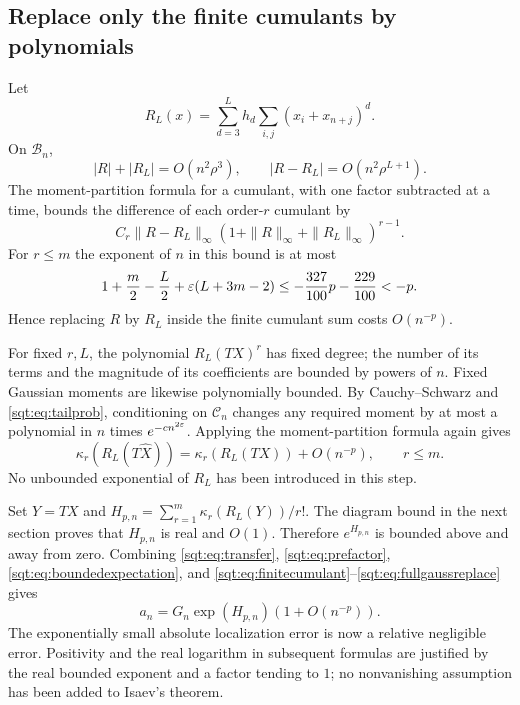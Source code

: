 \subsection{Replace only the finite cumulants by polynomials}
Let
\[
R_L(x)=\sum_{d=3}^L h_d\sum_{i,j}(x_i+x_{n+j})^d.
\]
On $\mathcal B_n$,
\begin{equation}\label{sqt:eq:RLbounds}
|R|+|R_L|=O(n^2\rho^3),\qquad |R-R_L|=O(n^2\rho^{L+1}).
\end{equation}
The moment-partition formula for a cumulant, with one factor subtracted at a time, bounds the difference of each order-$r$ cumulant by
\[
C_r\|R-R_L\|_\infty
 (1+\|R\|_\infty+\|R_L\|_\infty)^{r-1}.
\]
For $r\leq m$ the exponent of $n$ in this bound is at most
\begin{equation}\label{sqt:eq:replacementexponent}
1+\frac m2-\frac L2+\varepsilon(L+3m-2)
 \leq-\frac{327}{100}p-\frac{229}{100}<-p.
\end{equation}
Hence replacing $R$ by $R_L$ inside the finite cumulant sum costs $O(n^{-p})$.

For fixed $r,L$, the polynomial $R_L(TX)^r$ has fixed degree; the number of its terms and the magnitude of its coefficients are bounded by powers of $n$. Fixed Gaussian moments are likewise polynomially bounded. By Cauchy--Schwarz and \eqref{sqt:eq:tailprob}, conditioning on $\mathcal C_n$ changes any required moment by at most a polynomial in $n$ times $e^{-c n^{2\varepsilon}}$. Applying the moment-partition formula again gives
\begin{equation}\label{sqt:eq:fullgaussreplace}
\kappa_r(R_L(T\widehat X))=\kappa_r(R_L(TX))+O(n^{-p}),\qquad r\leq m.
\end{equation}
No unbounded exponential of $R_L$ has been introduced in this step.

Set $Y=TX$ and $H_{p,n}=\sum_{r=1}^m\kappa_r(R_L(Y))/r!$. The diagram bound in the next section proves that $H_{p,n}$ is real and $O(1)$. Therefore $e^{H_{p,n}}$ is bounded above and away from zero. Combining \eqref{sqt:eq:transfer}, \eqref{sqt:eq:prefactor}, \eqref{sqt:eq:boundedexpectation}, and \eqref{sqt:eq:finitecumulant}--\eqref{sqt:eq:fullgaussreplace} gives
\begin{equation}\label{sqt:eq:analyticreduction}
a_n=G_n\exp(H_{p,n})(1+O(n^{-p})).
\end{equation}
The exponentially small absolute localization error is now a relative negligible error. Positivity and the real logarithm in subsequent formulas are justified by the real bounded exponent and a factor tending to $1$; no nonvanishing assumption has been added to Isaev's theorem.
